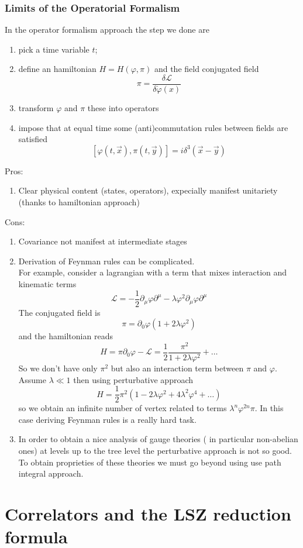 \documentclass[../main/main.tex]{subfiles}
\let\temp\phi
\let\phi\varphi
\let\varphi\temp
\begin{document}
\subsubsection{Limits of the Operatorial Formalism}
In the operator formalism approach the step we done are
\begin{enumerate}
\item pick a time variable $t$;
\item define an hamiltonian $H=H(\phi, \pi)$ and the field conjugated field 
\[\pi=\frac{\delta\mathcal L}{\delta\dot\phi(x)}\]
\item transform $\phi$ and $\pi$ these into operators
\item impose that at equal time some (anti)commutation rules between fields are satisfied
\[[\phi(t,\vec x),\pi(t,\vec y)]=i\delta^3(\vec x-\vec y)\]
\end{enumerate}
Pros: 
\begin{enumerate}
\item Clear physical content (states, operators), expecially manifest unitariety (thanks to hamiltonian approach)
\end{enumerate}
Cons:
\begin{enumerate}
\item Covariance not manifest at intermediate stages
\item Derivation of Feynman rules can be complicated.\\
For example, consider a lagrangian with a term that mixes interaction and kinematic terms
\[\mathcal L =-\frac12\partial_\mu\phi\partial^\mu-\lambda\phi^2\partial_\mu\phi\partial^\mu\]
The conjugated field is 
\[\pi=\partial_0\phi(1+2\lambda\phi^2)\]
and the hamiltonian reads
\[H=\pi\partial_0\phi-\mathcal L=\frac12\frac{\pi^2}{1+2\lambda\phi^2}+\dots\]
So we don't have only $\pi^2$ but also an interaction term between $\pi$ and $\phi$. Assume $\lambda\ll1$ then using perturbative approach
\[H=\frac12\pi^2(1-2\lambda\phi^2+4\lambda^2\phi^4+\dots)\]
so we obtain an infinite number of vertex related to terms $\lambda^n\phi^{2n}\pi$.
In this case deriving Feynman rules is a really hard task.
\item  In order to obtain a nice analysis of gauge theories ( in particular non-abelian ones) at levels up to the tree level the perturbative approach is not so good. To obtain proprieties of these theories we must go beyond using use path integral approach.
\end{enumerate}


\section{Correlators and the LSZ reduction formula}
\end{document}
